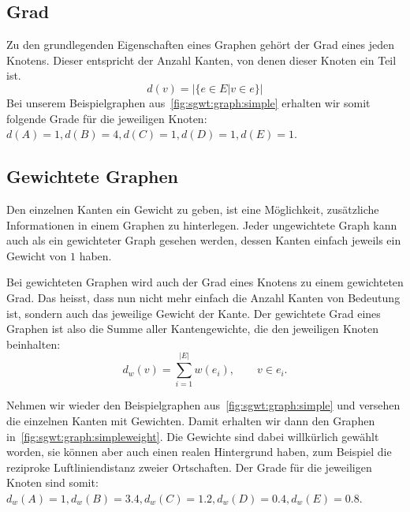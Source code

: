 \subsection{Grad}

Zu den grundlegenden Eigenschaften eines Graphen geh\"ort der Grad eines jeden 
Knotens. Dieser entspricht der Anzahl Kanten, von denen dieser Knoten ein 
Teil ist.
\begin{equation*}
    d(v) = | \{e \in E | v \in e \} |
\end{equation*}
Bei unserem Beispielgraphen aus~\cref{fig:sgwt:graph:simple} 
erhalten wir somit folgende Grade f\"ur die jeweiligen Knoten: $d(A) = 1, d(B) 
= 4, d(C) = 1, d(D) = 1, d(E) = 1$.

\subsection{Gewichtete Graphen}

Den einzelnen Kanten ein Gewicht zu geben, ist eine M\"oglichkeit, 
zus\"atzliche Informationen in einem Graphen zu hinterlegen. Jeder ungewichtete 
Graph kann auch als ein gewichteter Graph gesehen werden, dessen Kanten einfach 
jeweils ein Gewicht von $1$ haben.

Bei gewichteten Graphen wird auch der Grad eines Knotens zu einem gewichteten 
Grad. Das heisst, dass nun nicht mehr einfach die Anzahl Kanten von Bedeutung 
ist, sondern auch das jeweilige Gewicht der Kante. Der gewichtete Grad eines 
Graphen ist also die Summe aller Kantengewichte, die den jeweiligen Knoten 
beinhalten:
\begin{equation*}
    d_w(v) = \sum_{i = 1}^{|E|}w(e_i), \qquad v \in e_i.
\end{equation*}

Nehmen wir wieder den Beispielgraphen aus~\cref{fig:sgwt:graph:simple} und 
versehen die einzelnen Kanten mit Gewichten. Damit erhalten wir dann den 
Graphen in~\cref{fig:sgwt:graph:simpleweight}. Die Gewichte sind dabei 
willk\"urlich gew\"ahlt worden, sie k\"onnen aber auch einen realen Hintergrund 
haben, zum Beispiel die reziproke Luftliniendistanz zweier Ortschaften. Der 
Grade f\"ur die jeweiligen Knoten sind somit: $d_w(A) = 1, d_w(B) = 3.4, d_w(C) 
= 1.2, d_w(D) = 0.4, d_w(E) = 0.8$.


